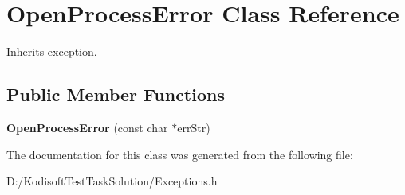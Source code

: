 \hypertarget{class_open_process_error}{\section{Open\+Process\+Error Class Reference}
\label{class_open_process_error}
}


Inherits exception.

\subsection*{Public Member Functions}
\begin{DoxyCompactItemize}
\item 
\hypertarget{class_open_process_error_a7a9e280d353cec5cc65b904dbbcd228a}{{\bfseries Open\+Process\+Error} (const char $\ast$err\+Str)}\label{class_open_process_error_a7a9e280d353cec5cc65b904dbbcd228a}

\end{DoxyCompactItemize}


The documentation for this class was generated from the following file\+:\begin{DoxyCompactItemize}
\item 
D\+:/\+Kodisoft\+Test\+Task\+Solution/Exceptions.\+h\end{DoxyCompactItemize}
